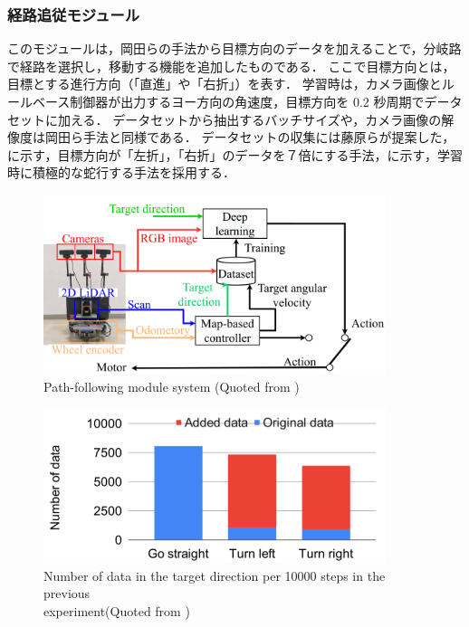 \clearpage
\subsubsection{経路追従モジュール}
このモジュールは，岡田らの手法から目標方向のデータを加えることで，分岐路で経路を選択し，移動する機能を追加したものである．
ここで目標方向とは，目標とする進行方向（「直進」や「右折」）を表す．
学習時は，カメラ画像とルールベース制御器が出力するヨー方向の角速度，目標方向を 0.2 秒周期でデータセットに加える．
データセットから抽出するバッチサイズや，カメラ画像の解像度は岡田ら手法と同様である．
データセットの収集には藤原ら\cite{fujiwara2023}が提案した，に示す，目標方向が「左折」，「右折」のデータを７倍にする手法，に示す，学習時に積極的な蛇行する手法を採用する．

\begin{figure}[htbp]
  \centering
  \includegraphics[width=100mm]{images/pdf/haruyama/pathfollow_sys.pdf}
  \caption[Path-following module system]{Path-following module system (Quoted from \cite{haruyama2023})}
  \label{fig:pathfollow}
\end{figure}

\begin{figure}[htbp]
  \centering
  \includegraphics[width=100mm]{images/pdf/fujiwara/oversample.pdf}
  \caption[Number of data in the target direction per 10000 steps in the previous experiment]{Number of data in the target direction per 10000 steps in the previous \\
  experiment(Quoted from \cite{fujiwara2023})}
  \label{fig:oversample}
\end{figure}

